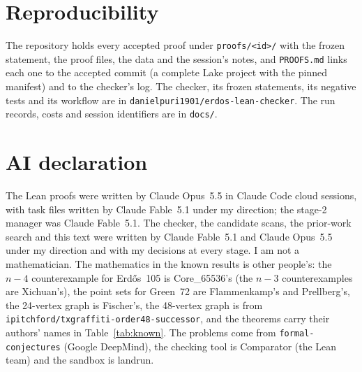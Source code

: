 \documentclass[11pt]{article}
\begin{document}
\section{Reproducibility}

The repository holds every accepted proof under \texttt{proofs/<id>/} with the frozen statement, the proof files, the data and the session's notes, and \texttt{PROOFS.md} links each one to the accepted commit (a complete Lake project with the pinned manifest) and to the checker's log.
The checker, its frozen statements, its negative tests and its workflow are in \texttt{danielpuri1901/erdos-lean-checker}.
The run records, costs and session identifiers are in \texttt{docs/}.

\section*{AI declaration}

The Lean proofs were written by Claude Opus~5.5 in Claude Code cloud sessions, with task files written by Claude Fable~5.1 under my direction; the stage-2 manager was Claude Fable~5.1.
The checker, the candidate scans, the prior-work search and this text were written by Claude Fable~5.1 and Claude Opus~5.5 under my direction and with my decisions at every stage.
I am not a mathematician.
The mathematics in the known results is other people's: the $n-4$ counterexample for Erd\H{o}s~105 is Core\_65536's (the $n-3$ counterexamples are Xichuan's), the point sets for Green~72 are Flammenkamp's and Prellberg's, the 24-vertex graph is Fischer's, the 48-vertex graph is from \texttt{ipitchford/txgraffiti-order48-successor}, and the theorems carry their authors' names in Table~\ref{tab:known}.
The problems come from \texttt{formal-conjectures} (Google DeepMind), the checking tool is Comparator (the Lean team) and the sandbox is landrun.
\end{document}
